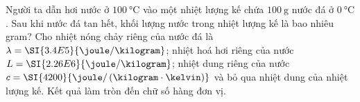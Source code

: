 \begin{ex}
	Người ta dẫn hơi nước ở $\SI{100}{\celsius}$ vào một nhiệt lượng kế chứa $\SI{100}{\gram}$ nước đá ở $\SI{0}{\celsius}$. Sau khi nước đá tan hết, khối lượng nước trong nhiệt lượng kế là bao nhiêu gram? Cho nhiệt nóng chảy riêng của nước đá là $\lambda=\SI{3.4E5}{\joule/\kilogram}$; nhiệt hoá hơi riêng của nước $L=\SI{2.26E6}{\joule/\kilogram}$; nhiệt dung riêng của nước $c=\SI{4200}{\joule/\left(\kilogram\cdot\kelvin\right)}$ và bỏ qua nhiệt dung của nhiệt lượng kế. Kết quả làm tròn đến chữ số hàng đơn vị.
\end{ex}
